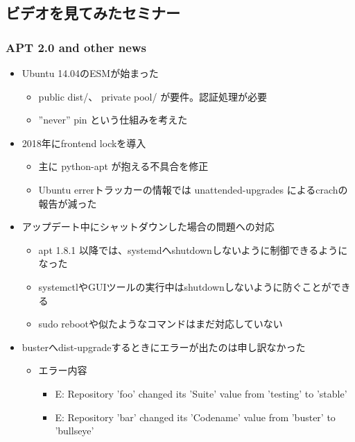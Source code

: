 \documentclass[mingoth,a4paper]{jsarticle}
\begin{document}
\subsection{ビデオを見てみたセミナー}

\subsubsection{APT 2.0 and other news}

%

\begin{itemize}
\item  Ubuntu 14.04のESMが始まった
  \begin{itemize}
  \item public dist/、 private pool/ が要件。認証処理が必要
  \item ''never'' pin という仕組みを考えた  
  \end{itemize}
\item 2018年にfrontend lockを導入
  \begin{itemize}
  \item 主に python-apt が抱える不具合を修正
  \item Ubuntu errerトラッカーの情報では unattended-upgrades によるcrachの報告が減った
  \end{itemize}
\item アップデート中にシャットダウンした場合の問題への対応
  \begin{itemize}
  \item apt 1.8.1 以降では、systemdへshutdownしないように制御できるようになった
  \item systemctlやGUIツールの実行中はshutdownしないように防ぐことができる
  \item sudo rebootや似たようなコマンドはまだ対応していない
  \end{itemize}
\item busterへdist-upgradeするときにエラーが出たのは申し訳なかった
  \begin{itemize}
  \item エラー内容
    \begin{itemize}
    \item E: Repository ’foo’ changed its ’Suite’ value from ’testing’ to ’stable’
    \item E: Repository ’bar’ changed its ’Codename’ value from ’buster’ to ’bullseye’
   \end{itemize}

\end{itemize}
\end{itemize}
\end{document}
